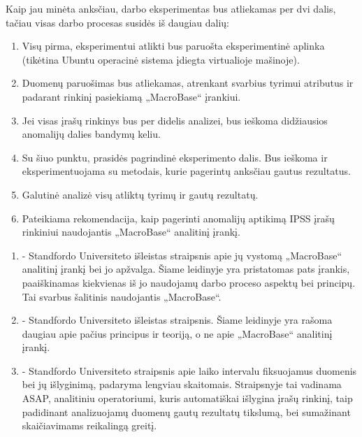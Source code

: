\documentclass{VUMIFPSbakalaurinis}
\begin{document}
Kaip jau minėta anksčiau, darbo eksperimentas bus atliekamas per dvi dalis, tačiau visas darbo procesas susidės iš daugiau dalių:

\begin{enumerate}
	\item Visų pirma, eksperimentui atlikti bus paruošta eksperimentinė aplinka (tikėtina Ubuntu operacinė sistema įdiegta virtualioje mašinoje).
	\item Duomenų paruošimas bus atliekamas, atrenkant svarbius tyrimui atributus ir padarant rinkinį pasiekiamą „MacroBase“ įrankiui.
	\item Jei visas įrašų rinkinys bus per didelis analizei, bus ieškoma didžiausios anomalijų dalies bandymų keliu.
	\item Su šiuo punktu, prasidės pagrindinė eksperimento dalis. Bus ieškoma ir eksperimentuojama su metodais, kurie pagerintų anksčiau gautus rezultatus.
	\item Galutinė analizė visų atliktų tyrimų ir gautų rezultatų.
	\item Pateikiama rekomendacija, kaip pagerinti anomalijų aptikimą IPSS įrašų rinkiniui naudojantis „MacroBase“ analitinį įrankį.
\end{enumerate}



\begin{enumerate}
	\item \textbf{\cite{macrobase_overview}} - Standfordo Universiteto išleistas straipsnis apie jų vystomą „MacroBase“ analitinį įrankį bei jo apžvalga. Šiame leidinyje yra pristatomas pats įrankis, paaiškinamas kiekvienas iš jo naudojamų darbo proceso aspektų bei principų. Tai svarbus šalitinis naudojantis „MacroBase“.
	\item \textbf{\cite{prioritizing_attention}} - Standfordo Universiteto išleistas straipsnis. Šiame leidinyje yra rašoma daugiau apie pačius principus ir teoriją, o ne apie  „MacroBase“ analitinį įrankį.
	\item \textbf{\cite{asap}} - Standfordo Universiteto straipsnis apie laiko intervalu fiksuojamus duomenis bei jų išlyginimą, padaryma lengviau skaitomais. Straipsnyje tai vadinama ASAP, analitiniu operatoriumi, kuris automatiškai išlygina įrašų rinkinį, taip padidinant analizuojamų duomenų gautų rezultatų tikslumą, bei sumažinant skaičiavimams reikalingą greitį.
\end{enumerate}
\end{document}
